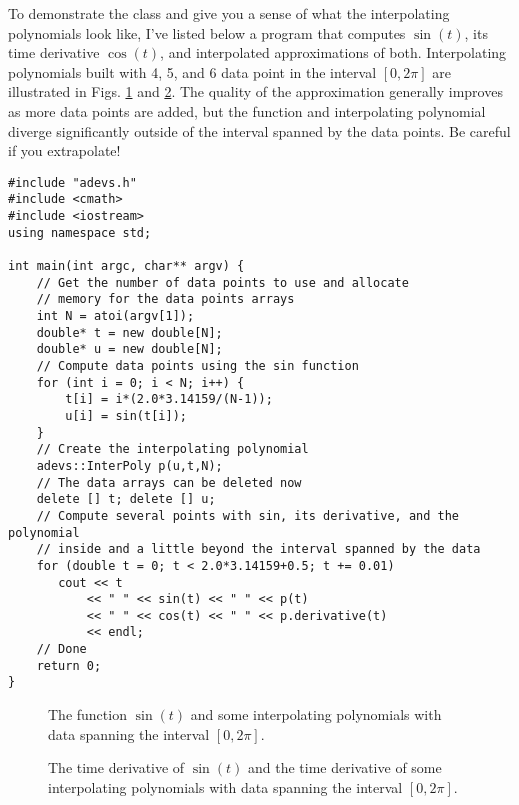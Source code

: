 To demonstrate the  class and give you a sense of what the interpolating polynomials look like, I've listed below a program that computes $\sin(t)$, its time derivative $\cos(t)$, and interpolated approximations of both. Interpolating polynomials built with 4, 5, and 6 data point in the interval $[0,2\pi]$ are illustrated in Figs. \ref{fig:sin_inter} and \ref{fig:cos_inter}. The quality of the approximation generally improves as more data points are added, but the function and interpolating polynomial diverge significantly outside of the interval spanned by the data points. Be careful if you extrapolate! 
\begin{verbatim}
#include "adevs.h"
#include <cmath>
#include <iostream>
using namespace std;

int main(int argc, char** argv) {
    // Get the number of data points to use and allocate 
    // memory for the data points arrays
    int N = atoi(argv[1]);
    double* t = new double[N];
    double* u = new double[N];
    // Compute data points using the sin function
    for (int i = 0; i < N; i++) {
        t[i] = i*(2.0*3.14159/(N-1));
        u[i] = sin(t[i]);
    }
    // Create the interpolating polynomial
    adevs::InterPoly p(u,t,N);
    // The data arrays can be deleted now
    delete [] t; delete [] u;
    // Compute several points with sin, its derivative, and the polynomial
    // inside and a little beyond the interval spanned by the data 
    for (double t = 0; t < 2.0*3.14159+0.5; t += 0.01) 
       cout << t 
           << " " << sin(t) << " " << p(t)
           << " " << cos(t) << " " << p.derivative(t)
           << endl;
    // Done
    return 0;
}
\end{verbatim}
\begin{figure}[ht]
\centering
{}
\caption{The function $\sin(t)$ and some interpolating polynomials with data spanning the interval $[0,2\pi]$.}
\label{fig:sin_inter}
\end{figure}
\begin{figure}[ht]
\centering
{}
\caption{The time derivative of $\sin(t)$ and the time derivative of some interpolating polynomials with data spanning the interval $[0,2\pi]$.}
\label{fig:cos_inter}
\end{figure}
